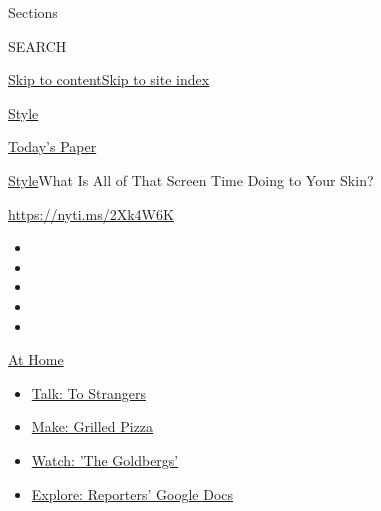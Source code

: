 Sections

SEARCH

\protect\hyperlink{site-content}{Skip to
content}\protect\hyperlink{site-index}{Skip to site index}

\href{https://www.nytimes3xbfgragh.onion/section/style}{Style}

\href{https://myaccount.nytimes3xbfgragh.onion/auth/login?response_type=cookie\&client_id=vi}{}

\href{https://www.nytimes3xbfgragh.onion/section/todayspaper}{Today's
Paper}

\href{/section/style}{Style}\textbar{}What Is All of That Screen Time
Doing to Your Skin?

\url{https://nyti.ms/2Xk4W6K}

\begin{itemize}
\item
\item
\item
\item
\item
\end{itemize}

\href{https://www.nytimes3xbfgragh.onion/spotlight/at-home?action=click\&pgtype=Article\&state=default\&region=TOP_BANNER\&context=at_home_menu}{At
Home}

\begin{itemize}
\tightlist
\item
  \href{https://www.nytimes3xbfgragh.onion/2020/08/03/well/family/the-benefits-of-talking-to-strangers.html?action=click\&pgtype=Article\&state=default\&region=TOP_BANNER\&context=at_home_menu}{Talk:
  To Strangers}
\item
  \href{https://www.nytimes3xbfgragh.onion/2020/08/01/at-home/coronavirus-make-pizza-on-a-grill.html?action=click\&pgtype=Article\&state=default\&region=TOP_BANNER\&context=at_home_menu}{Make:
  Grilled Pizza}
\item
  \href{https://www.nytimes3xbfgragh.onion/2020/07/31/arts/television/goldbergs-abc-stream.html?action=click\&pgtype=Article\&state=default\&region=TOP_BANNER\&context=at_home_menu}{Watch:
  'The Goldbergs'}
\item
  \href{https://www.nytimes3xbfgragh.onion/interactive/2020/at-home/even-more-reporters-editors-diaries-lists-recommendations.html?action=click\&pgtype=Article\&state=default\&region=TOP_BANNER\&context=at_home_menu}{Explore:
  Reporters' Google Docs}
\end{itemize}

